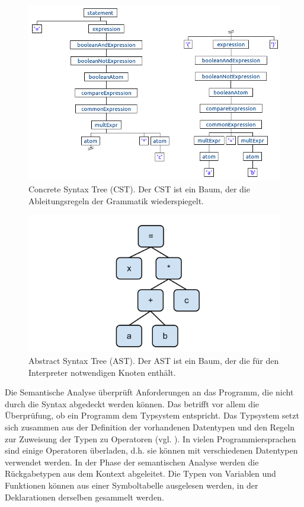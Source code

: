 \begin{figure}[h]
\includegraphics[width=\textwidth,scale=0.2]{figures/cst_beispiel.png}
\caption{Concrete Syntax Tree (CST). Der CST ist ein Baum, der die Ableitungsregeln der Grammatik wiederspiegelt.}
\label{abb_beispiel_cst}
\end{figure}

\begin{figure}[h]
\includegraphics[scale=0.5]{figures/ast_beispiel.png}
\begin{center}
\caption{Abstract Syntax Tree (AST). Der AST ist ein Baum, der die für den Interpreter notwendigen Knoten enthält.}
\end{center}

\label{abb_beispiel_ast}
\end{figure}

Die Semantische Analyse überprüft Anforderungen an das Programm, die nicht durch die Syntax abgedeckt werden können. Das betrifft vor allem die Überprüfung, ob ein Programm dem Typsystem entspricht. Das Typsystem setzt sich zusammen aus der Definition der vorhandenen Datentypen und den Regeln zur Zuweisung der Typen zu Operatoren (vgl. \cite[S. 426]{AhSe86}). In vielen Programmiersprachen sind einige Operatoren überladen, d.h. sie können mit verschiedenen Datentypen verwendet werden. In der Phase der semantischen Analyse werden die Rückgabetypen aus dem Kontext abgeleitet. Die Typen von Variablen und Funktionen können aus einer Symboltabelle ausgelesen werden, in der Deklarationen derselben gesammelt werden.

